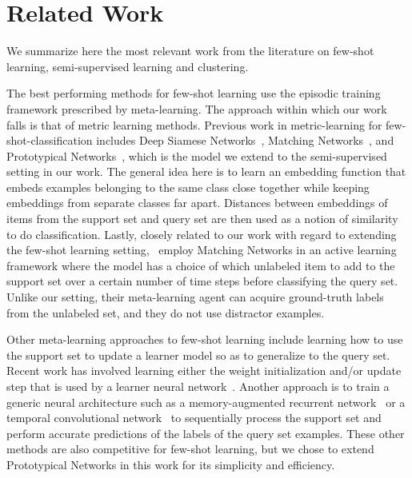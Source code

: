 \section{Related Work}

We summarize here the most relevant work from the literature on few-shot learning, semi-supervised learning and clustering.

The best performing methods for few-shot learning use the episodic training framework prescribed by
meta-learning. The approach within which our work falls is that of metric learning methods. Previous
work in metric-learning for few-shot-classification includes Deep Siamese
Networks~\citep{koch2015siamese}, Matching Networks~\citep{vinyals2016matchingnet}, and Prototypical
Networks~\citep{snell2017protonet}, which is the model we extend to the semi-supervised setting in
our work. The general idea here is to learn an embedding function that embeds examples belonging to
the same class close together while keeping embeddings from separate classes far apart. Distances
between embeddings of items from the support set and query set are then used as a notion of
similarity to do classification. Lastly, closely related to our work with regard to extending the
few-shot learning setting,~\cite{bachman2017active-learning} employ Matching Networks in an active
learning framework where the model has a choice of which unlabeled item to add to the support set
over a certain number of time steps before classifying the query set. Unlike our setting, their
meta-learning agent can acquire ground-truth labels from the unlabeled set, and they do not use
distractor examples.

Other meta-learning approaches to few-shot learning include learning how to use the support set to
update a learner model so as to generalize to the query set. Recent work has involved learning
either the weight initialization and/or update step that is used by a learner neural
network~\citep{ravi2017oneshot,FinnC2017}. Another approach is to train a generic neural
architecture such as a memory-augmented recurrent network~\citep{Santoro2016} or a temporal
convolutional network~\citep{MishraN2017} to sequentially process the support set and perform
accurate predictions of the labels of the query set examples. These other methods are also
competitive for few-shot learning, but we chose to extend Prototypical Networks in this work for its
simplicity and efficiency.

